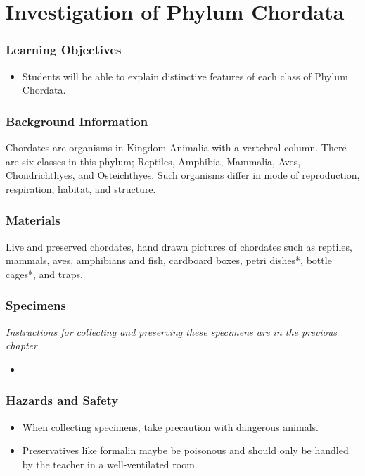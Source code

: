 \section{Investigation of Phylum Chordata}

\subsubsection*{Learning Objectives}
\begin{itemize}
\item{Students will be able to explain distinctive features of each class of Phylum Chordata.}
\end{itemize}

\subsubsection*{Background Information}
Chordates are organisms in Kingdom Animalia with a vertebral column. There are six classes in this phylum; Reptiles, Amphibia, Mammalia, Aves, Chondrichthyes, and Osteichthyes. Such organisms differ in mode of reproduction, respiration, habitat, and structure.

\subsubsection*{Materials}
Live and preserved chordates, hand drawn pictures of chordates such as reptiles, mammals, aves, amphibians and fish, cardboard boxes, petri dishes*, bottle cages*, and traps.

\subsubsection*{Specimens}
\textit{Instructions for collecting and preserving these specimens are in the previous chapter}
\begin{itemize}
\item{}
\end{itemize}

\subsubsection*{Hazards and Safety}
\begin{itemize}
\item{When collecting specimens, take precaution with dangerous animals.}
\item{Preservatives like formalin maybe be poisonous and should only be handled by the teacher in a well-ventilated room.}
\end{itemize}


